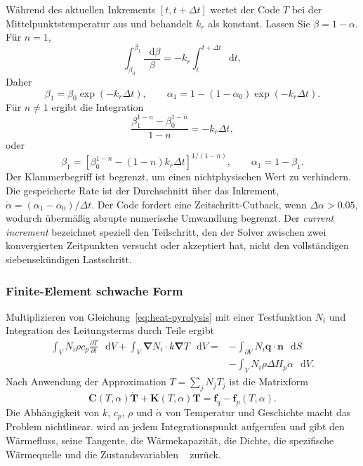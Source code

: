 \documentclass[oneside,openany]{amsdtx}
\newcommand{\dd}{\mathop{}\!\mathrm{d}}
\newcommand{\pd}{\partial}
\newcommand{\vect}[1]{\bm{#1}}
\begin{document}
Während des aktuellen Inkrements \([t,t+\Delta t]\) wertet der Code \(T\) bei der Mittelpunktstemperatur aus und behandelt \(k_r\) als konstant. Lassen Sie \(\beta=1-\alpha\). Für \(n=1\),
\begin{equation}
  \int_{\beta_0}^{\beta_1}\frac{\dd\beta}{\beta}
  =-k_r\int_t^{t+\Delta t}\dd t,
\end{equation}
Daher
\begin{equation}
  \beta_1=\beta_0\exp(-k_r\Delta t),\qquad
  \boxed{\alpha_1=1-(1-\alpha_0)\exp(-k_r\Delta t).}
  \label{eq:analytic-n1}
\end{equation}
Für \(n\ne1\) ergibt die Integration
\begin{equation}
  \frac{\beta_1^{1-n}-\beta_0^{1-n}}{1-n}=-k_r\Delta t,
\end{equation}
oder
\begin{equation}
  \boxed{\beta_1=
  \left[\beta_0^{1-n}-(1-n)k_r\Delta t\right]^{1/(1-n)},
  \qquad\alpha_1=1-\beta_1.}
  \label{eq:analytic-n}
\end{equation}
Der Klammerbegriff ist begrenzt, um einen nichtphysischen Wert zu verhindern. Die gespeicherte Rate ist der Durchschnitt über das Inkrement, \(\dot\alpha=(\alpha_1-\alpha_0)/\Delta t\). Der Code fordert eine Zeitschritt-Cutback, wenn \(\Delta\alpha>0{.}05\), wodurch übermäßig abrupte numerische Umwandlung begrenzt. Der \emph{current increment} bezeichnet speziell den Teilschritt, den der Solver zwischen zwei konvergierten Zeitpunkten versucht oder akzeptiert hat, nicht den vollständigen siebensekündigen Lastschritt.

\subsubsection{Finite-Element schwache Form}

Multiplizieren von Gleichung~\eqref{eq:heat-pyrolysis} mit einer Testfunktion \(N_i\) und Integration des Leitungsterms durch Teile ergibt
\begin{align}
  \int_V N_i\rho c_p\frac{\pd T}{\pd t}\,\dd V
  +\int_V \vect\nabla N_i\cdot k\vect\nabla T\,\dd V
  ={}&-\int_{\partial V}N_i\vect q\cdot\vect n\,\dd S \\
  &-\int_V N_i\rho\Delta H_p\dot\alpha\,\dd V.
  \label{eq:weak}
\end{align}
Nach Anwendung der Approximation \(T=\sum_jN_jT_j\) ist die Matrixform
\begin{equation}
  \vect C(T,\alpha)\dot{\vect T}
  +\vect K(T,\alpha)\vect T
  =\vect f_q-\vect f_p(T,\alpha).
\end{equation}
Die Abhängigkeit von \(k\), \(c_p\), \(\rho\) und \(\dot\alpha\) von Temperatur und Geschichte macht das Problem nichtlinear.  wird an jedem Integrationspunkt aufgerufen und gibt den Wärmefluss, seine Tangente, die Wärmekapazität, die Dichte, die spezifische Wärmequelle und die Zustandsvariablen ~\cite{ansys-usermatth} zurück.
\end{document}
